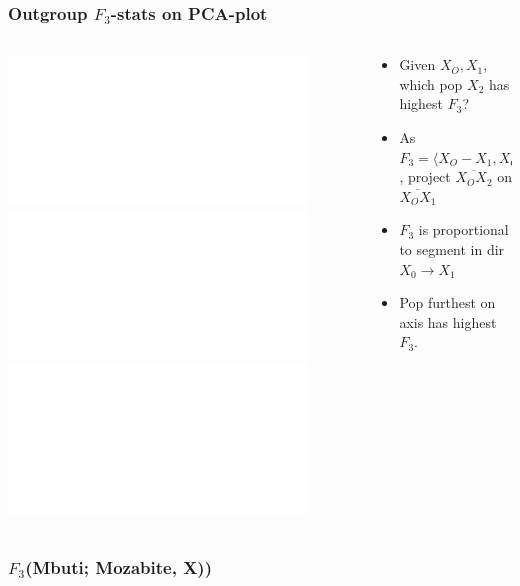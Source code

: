 \documentclass[11pt]{beamer}
\begin{document}
\begin{frame}
	\frametitle{Outgroup $F_3$-stats on PCA-plot}
	\begin{columns}
		\begin{column}{0.4\textwidth}
			\includegraphics<1-2>{figures/f3_on_pca_3b.pdf}
			\includegraphics<3>{figures/f3_on_pca_3.pdf}		
			\includegraphics<4->{figures/f3_on_pca_3c.pdf}			
		\end{column}
		\begin{column}{0.6\textwidth}
			\begin{itemize}
				\item<1-> Given $X_O, X_1$, which pop $X_2$ has highest $F_3$?
			\end{itemize}
		\begin{itemize}	
	\item<2-> As $F_3 = \langle X_O - X_1, X_O - X_2 \rangle$, project $\overline{X_OX_2}$ on $\overline{X_OX_1}$
	\item<3-> $F_3$ is proportional to segment in dir $X_0 \rightarrow X_1$
	\item<4-> Pop furthest on axis has highest $F_3$.
\end{itemize}		
	  	
		\end{column}
	\end{columns}
\end{frame}


\begin{frame}
\frametitle{$F_3$(Mbuti; Mozabite, X))}
\begin{center}
\end{center}
\end{frame}
\end{document}
